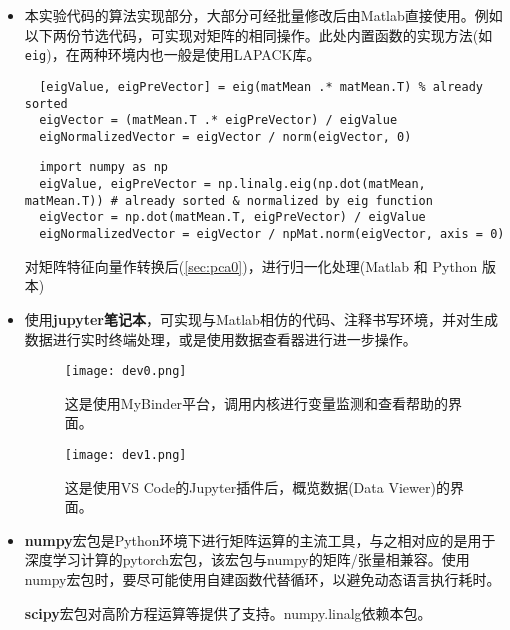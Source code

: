 \begin{itemize}
\item 本实验代码的算法实现部分，大部分可经批量修改后由Matlab直接使用。例如以下两份节选代码，可实现对矩阵的相同操作。此处内置函数的实现方法(如\verb|eig|)，在两种环境内也一般是使用LAPACK库。\cite{Tobler_2019, Numpy_eig}
\begin{listing}[!ht]
\begin{verbatim}
  [eigValue, eigPreVector] = eig(matMean .* matMean.T) % already sorted
  eigVector = (matMean.T .* eigPreVector) / eigValue
  eigNormalizedVector = eigVector / norm(eigVector, 0)
\end{verbatim}
\begin{verbatim}
  import numpy as np
  eigValue, eigPreVector = np.linalg.eig(np.dot(matMean, matMean.T)) # already sorted & normalized by eig function
  eigVector = np.dot(matMean.T, eigPreVector) / eigValue
  eigNormalizedVector = eigVector / npMat.norm(eigVector, axis = 0)
\end{verbatim}
\caption{对矩阵特征向量作转换后(\autoref{sec:pca0})，进行归一化处理(Matlab 和 Python 版本)}
\label{listing:dev}
\end{listing}

\item 使用\textbf{jupyter笔记本}，可实现与Matlab相仿的代码、注释书写环境，并对生成数据进行实时终端处理，或是使用数据查看器进行进一步操作。
\begin{figure}[h]
    \centering
    \texttt{[image: dev0.png]}
    \caption{这是使用MyBinder平台，调用内核进行变量监测和查看帮助的界面。}
    \label{fig:jupyter-0}
\end{figure}
\begin{figure}[h]
    \centering
    \texttt{[image: dev1.png]}
    \caption{这是使用VS Code的Jupyter插件后\cite{Claudia_2021}，概览数据(Data Viewer)的界面。}
    \label{fig:jupyter-1}
\end{figure}

\item \textbf{numpy}宏包是Python环境下进行矩阵运算的主流工具，与之相对应的是用于深度学习计算的\textsf{pytorch}宏包，该宏包与numpy的矩阵/张量相兼容。使用numpy宏包时，要尽可能使用自建函数代替循环，以避免动态语言执行耗时。\cite{Numpy_multi_dot}

\textbf{scipy}宏包对高阶方程运算等提供了支持。numpy.linalg依赖本包。


\end{itemize}
